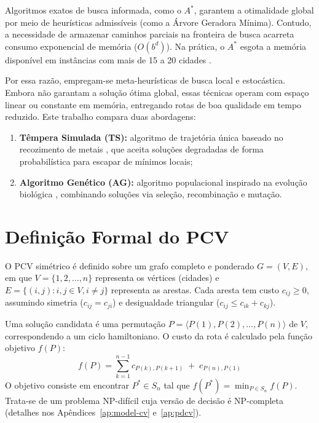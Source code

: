 \documentclass[11pt]{article}
\begin{document}
Algoritmos exatos de busca informada, como o $A^*$, garantem a otimalidade global por meio de heurísticas admissíveis (como a Árvore Geradora Mínima). Contudo, a necessidade de armazenar caminhos parciais na fronteira de busca acarreta consumo exponencial de memória ($O(b^d)$). Na prática, o $A^*$ esgota a memória disponível em instâncias com mais de 15 a 20 cidades \cite{russell2022ia}.

Por essa razão, empregam-se meta-heurísticas de busca local e estocástica. Embora não garantam a solução ótima global, essas técnicas operam com espaço linear ou constante em memória, entregando rotas de boa qualidade em tempo reduzido. Este trabalho compara duas abordagens:
\begin{enumerate}
    \item \textbf{Têmpera Simulada (TS):} algoritmo de trajetória única baseado no recozimento de metais \cite{kirkpatrick1983optimization}, que aceita soluções degradadas de forma probabilística para escapar de mínimos locais;
    \item \textbf{Algoritmo Genético (AG):} algoritmo populacional inspirado na evolução biológica \cite{russell2022ia}, combinando soluções via seleção, recombinação e mutação.
\end{enumerate}

\section{Definição Formal do PCV}

O PCV simétrico é definido sobre um grafo completo e ponderado $G = (V, E)$, em que $V = \{1, 2, \dots, n\}$ representa os vértices (cidades) e $E = \{(i, j) : i, j \in V, i \neq j\}$ representa as arestas. Cada aresta tem custo $c_{ij} \ge 0$, assumindo simetria ($c_{ij} = c_{ji}$) e desigualdade triangular ($c_{ij} \le c_{ik} + c_{kj}$).

Uma solução candidata é uma permutação $P = \langle P(1), P(2), \dots, P(n) \rangle$ de $V$, correspondendo a um ciclo hamiltoniano. O custo da rota é calculado pela função objetivo $f(P)$:
\begin{equation} \label{eq:custo_pcv}
f(P) = \sum_{k=1}^{n-1} c_{P(k), P(k+1)} \;+\; c_{P(n), P(1)}
\end{equation}
O objetivo consiste em encontrar $P^* \in S_n$ tal que $f(P^*) = \min_{P \in S_n} f(P)$. Trata-se de um problema NP-difícil cuja versão de decisão é NP-completa (detalhes nos Apêndices~\ref{ap:model-cv} e~\ref{ap:pdcv}).
\end{document}
